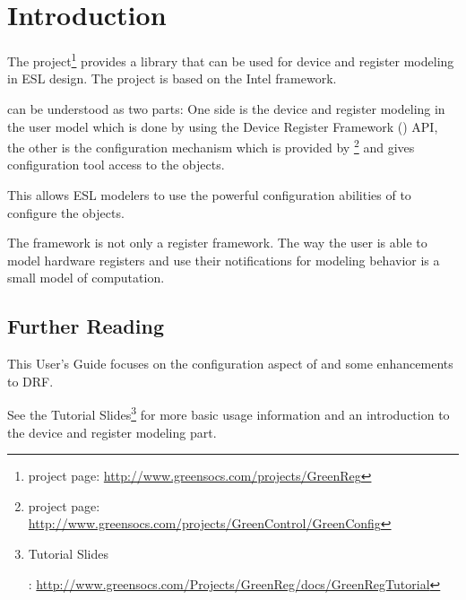 
\cleardoublepage
\chapter{Introduction}

The \GreenReg project\footnote{\GreenReg project page:  \href{http://www.greensocs.com/projects/GreenReg}{http://www.greensocs.com/projects/GreenReg}} provides a library that can be used for device and register modeling in ESL design. The project is based on the Intel \DRF framework.

\GreenReg can be understood as two parts: One side is the device and register modeling in the user model which is done by using the Device Register Framework (\DRF) API, the other is the configuration mechanism which is provided by \GreenConfig\footnote{\GreenConfig project page:  \href{http://www.greensocs.com/projects/GreenControl/GreenConfig}{http://www.greensocs.com/projects/GreenControl/GreenConfig}} and gives configuration tool access to the \DRF objects.

This allows ESL modelers to use the powerful configuration abilities of \GreenConfig to configure the \DRF objects.

The \GreenReg framework is not only a register framework. The way the user is able to model hardware registers and use their notifications for modeling behavior is a small model of computation.

\section{Further Reading}

This User's Guide focuses on the configuration aspect of \GreenReg and some enhancements to DRF.

See the \GreenReg Tutorial Slides\footnote{\hypertarget{lnk:TutorialSlides}{\GreenReg Tutorial Slides}:  \href{http://www.greensocs.com/Projects/GreenReg/docs/GreenRegTutorial}{http://www.greensocs.com/Projects/GreenReg/docs/GreenRegTutorial}} for more basic usage information and an introduction to the device and register modeling part. 
